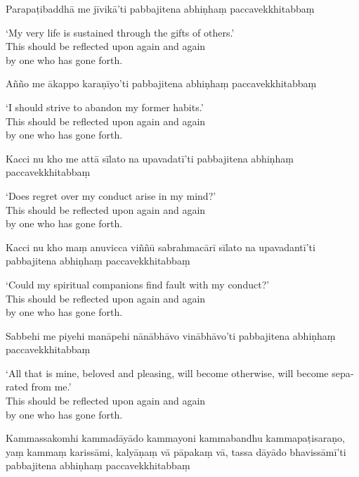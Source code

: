 Parapaṭibaddhā me jīvikā'ti pabbajitena abhiṇhaṃ paccavekkhitabbaṃ

\begin{english}
  `My very life is sustained through the gifts of others.'\\
  This should be reflected upon again and again\\
  by one who has gone forth.
\end{english}

Añño me ākappo karaṇīyo'ti pabbajitena abhiṇhaṃ paccavekkhitabbaṃ

\begin{english}
  `I should strive to abandon my former habits.'\\
  This should be reflected upon again and again\\
  by one who has gone forth.
\end{english}

Kacci nu kho me attā sīlato na upavadatī'ti pabbajitena abhiṇhaṃ paccavekkhitabbaṃ

\begin{english}
  `Does regret over my conduct arise in my mind?'\\
  This should be reflected upon again and again\\
  by one who has gone forth.
\end{english}

Kacci nu kho maṃ anuvicca viññū sabrahmacārī sīlato na upavadantī'ti pabbajitena abhiṇhaṃ paccavekkhitabbaṃ

\begin{english}
  `Could my spiritual companions find fault with my conduct?'\\
  This should be reflected upon again and again\\
  by one who has gone forth.
\end{english}

Sabbehi me piyehi manāpehi nānābhāvo vinābhāvo'ti pabbajitena abhiṇhaṃ paccavekkhitabbaṃ

\begin{english}
  `All that is mine, beloved and pleasing, will become otherwise, will become separated from me.'\\
  This should be reflected upon again and again\\
  by one who has gone forth.
\end{english}

Kammassakomhi kammadāyādo kammayoni kammabandhu kammapaṭisaraṇo, yaṃ kammaṃ karissāmi, kalyāṇaṃ vā pāpakaṃ vā, tassa dāyādo bhavissāmī'ti pabbajitena abhiṇhaṃ paccavekkhitabbaṃ

